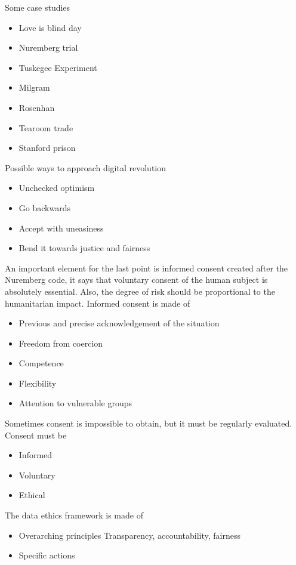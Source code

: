 Some case studies

\begin{itemize}
    \item Love is blind day
    \item Nuremberg trial
    \item Tuskegee Experiment
    \item Milgram
    \item Rosenhan
    \item Tearoom trade
    \item Stanford prison 
\end{itemize}

Possible ways to approach digital revolution
\begin{itemize}
    \item Unchecked optimism
    \item Go backwards
    \item Accept with uneasiness
    \item Bend it towards justice and fairness
\end{itemize}

An important element for the last point is informed consent created after the Nuremberg code, it says that voluntary consent of the human subject is absolutely essential. Also, the degree of risk should be proportional to the humanitarian impact.
Informed consent is made of 

\begin{itemize}
    \item Previous and precise acknowledgement of the situation
    \item Freedom from coercion
    \item Competence
    \item Flexibility
    \item Attention to vulnerable groups
\end{itemize}

Sometimes consent is impossible to obtain, but it must be regularly evaluated.
Consent must be
\begin{itemize}
    \item Informed
    \item Voluntary
    \item Ethical 
\end{itemize}

The data ethics framework is made of 

\begin{itemize}
    \item Overarching principles \ra Transparency, accountability, fairness
    \item Specific actions
\end{itemize}  























